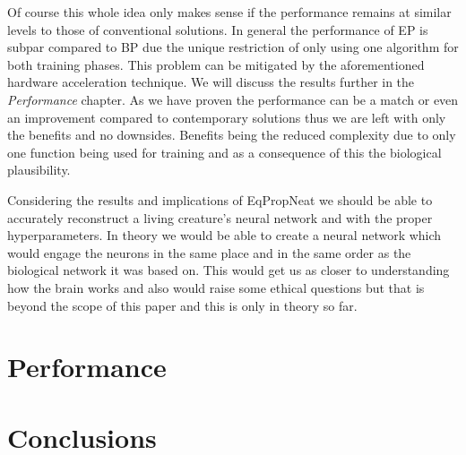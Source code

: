 \documentclass[lettersize,journal]{IEEEtran}
\begin{document}
		Of course this whole idea only makes sense if the performance remains at similar levels to those of conventional solutions. In general the performance of EP is subpar compared to BP due the unique restriction of only using one algorithm for both training phases. This problem can be mitigated by the aforementioned hardware acceleration technique. We will discuss the results further in the \textit{Performance} chapter. As we have proven the performance can be a match or even an improvement compared to contemporary solutions thus we are left with only the benefits and no downsides. Benefits being the reduced complexity due to only one function being used for training and as a consequence of this the biological plausibility.
		
		Considering the results and implications of EqPropNeat we should be able to accurately reconstruct a living creature's neural network and with the proper hyperparameters. In theory we would be able to create a neural network which would engage the neurons in the same place and in the same order as the biological network it was based on. This would get us as closer to understanding how the brain works and also would raise some ethical questions but that is beyond the scope of this paper and this is only in theory so far.
		\section{Performance}
		\section{Conclusions}
		
		
		
		
	
\end{document}
